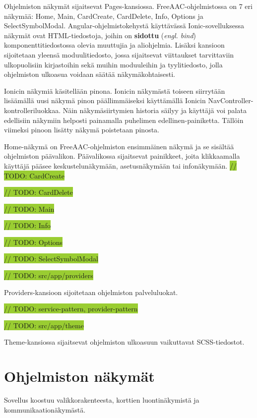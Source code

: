 \documentclass[utf8]{gradu3}
\begin{document}
Ohjelmiston näkymät sijaitsevat Pages-kansiossa. FreeAAC-ohjelmistossa on 7 eri näkymää: Home, Main, CardCreate, CardDelete, Info, Options ja SelectSymbolModal. Angular-ohjelmistokehystä käyttävässä Ionic-sovelluksessa näkymät ovat HTML-tiedostoja, joihin on \textbf{sidottu} (\textit{engl. bind}) komponenttitiedostossa olevia muuttujia ja aliohjelmia. Lisäksi kansioon sijoitetaan yleensä moduulitiedosto, jossa sijaitsevat viittaukset tarvittaviin ulkopuolisiin kirjastoihin sekä muihin moduuleihin ja tyylitiedosto, jolla ohjelmiston ulkoasua voidaan säätää näkymäkohtaisesti.

Ionicin näkymiä käsitellään pinona. Ionicin näkymästä toiseen siirrytään lisäämällä uusi näkymä pinon päällimmäiseksi käyttämällä Ionicin NavController-kontrolleriluokkaa. Näin näkymäsiirtymien historia säilyy ja käyttäjä voi palata edellisiin näkymiin helposti painamalla puhelimen edellinen-painiketta. Tällöin viimeksi pinoon lisätty näkymä poistetaan pinosta.

Home-näkymä on FreeAAC-ohjelmiston ensimmäinen näkymä ja se sisältää ohjelmiston päävalikon. Päävalikossa sijaitsevat painikkeet, joita klikkaamalla käyttäjä pääsee keskustelunäkymään, asetusnäkymään tai infonäkymään. 
\colorbox{YellowGreen}{// TODO: CardCreate}

\colorbox{YellowGreen}{// TODO: CardDelete}

\colorbox{YellowGreen}{// TODO: Main}

\colorbox{YellowGreen}{// TODO: Info}


\colorbox{YellowGreen}{// TODO: Options}

\colorbox{YellowGreen}{// TODO: SelectSymbolModal}

\colorbox{YellowGreen}{// TODO: src/app/providers}

Providers-kansioon sijoitetaan ohjelmiston palveluluokat.

\colorbox{YellowGreen}{// TODO: service-pattern, provider-pattern}

\colorbox{YellowGreen}{// TODO: src/app/theme}

Theme-kansiossa sijaitsevat ohjelmiston ulkoasuun vaikuttavat SCSS-tiedostot.

\section{Ohjelmiston näkymät}

Sovellus koostuu valikkorakenteesta, korttien luontinäkymistä ja kommunikaationäkymästä.
\end{document}
